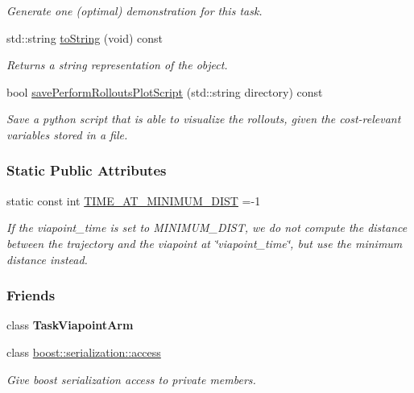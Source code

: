 \begin{DoxyCompactItemize}
\begin{DoxyCompactList}\small\item\em Generate one (optimal) demonstration for this task. \end{DoxyCompactList}\item 
std\+::string \hyperlink{classDmpBbo_1_1TaskViapoint_a1aca816b42cf0d36118be0ab91120d77}{to\+String} (void) const 
\begin{DoxyCompactList}\small\item\em Returns a string representation of the object. \end{DoxyCompactList}\item 
bool \hyperlink{classDmpBbo_1_1TaskViapoint_aba32082ed78ee88beda0e8f907244e65}{save\+Perform\+Rollouts\+Plot\+Script} (std\+::string directory) const 
\begin{DoxyCompactList}\small\item\em Save a python script that is able to visualize the rollouts, given the cost-\/relevant variables stored in a file. \end{DoxyCompactList}\end{DoxyCompactItemize}
\subsubsection*{Static Public Attributes}
\begin{DoxyCompactItemize}
\item 
static const int \hyperlink{classDmpBbo_1_1TaskViapoint_a4cdb8b00e89770014fb33674de175a39}{T\+I\+M\+E\+\_\+\+A\+T\+\_\+\+M\+I\+N\+I\+M\+U\+M\+\_\+\+D\+I\+S\+T} =-\/1
\begin{DoxyCompactList}\small\item\em If the viapoint\+\_\+time is set to M\+I\+N\+I\+M\+U\+M\+\_\+\+D\+I\+S\+T, we do not compute the distance between the trajectory and the viapoint at \char`\"{}viapoint\+\_\+time\char`\"{}, but use the minimum distance instead. \end{DoxyCompactList}\end{DoxyCompactItemize}
\subsubsection*{Friends}
\begin{DoxyCompactItemize}
\item 
\hypertarget{classDmpBbo_1_1TaskViapoint_a9cf7db79fe8dd5ac9b595809253e89e7}{class {\bfseries Task\+Viapoint\+Arm}}\label{classDmpBbo_1_1TaskViapoint_a9cf7db79fe8dd5ac9b595809253e89e7}

\item 
class \hyperlink{classDmpBbo_1_1TaskViapoint_ac98d07dd8f7b70e16ccb9a01abf56b9c}{boost\+::serialization\+::access}
\begin{DoxyCompactList}\small\item\em Give boost serialization access to private members. \end{DoxyCompactList}\end{DoxyCompactItemize}


